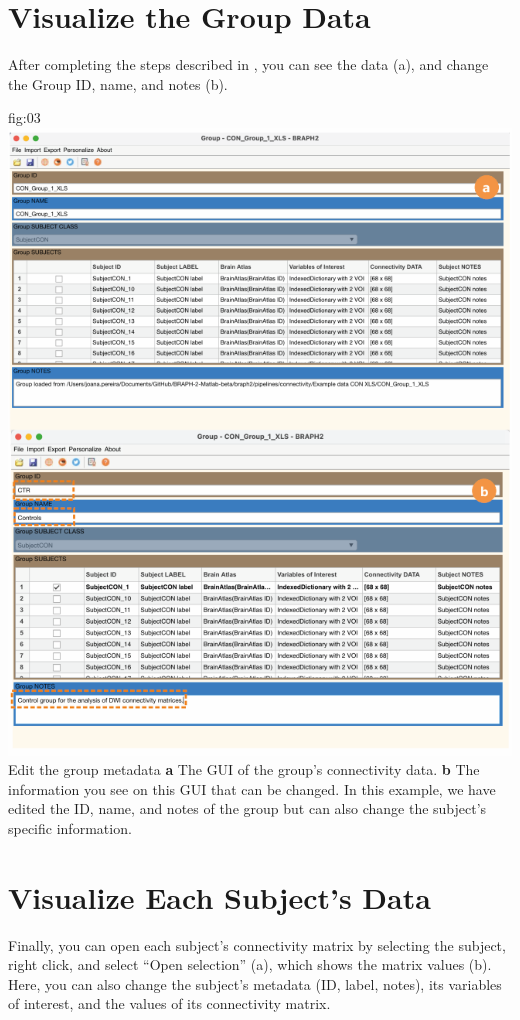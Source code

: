 \documentclass[justified]{tufte-handout}
\begin{document}
\section{Visualize the Group Data}

After completing the steps described in , you can see the data (a), and change the Group ID, name, and notes (b). 

	{fig:03}
	{
	\includegraphics{fig03}
	}
	{Edit the group metadata}
	{ 
	{\bf a} The GUI of the group's connectivity data. 
	{\bf b} The information you see on this GUI that can be changed. In this example, we have edited the ID, name, and notes of the group but can also change the subject's specific information.
	}

\section{Visualize Each Subject's Data}

Finally, you can open each subject's connectivity matrix by selecting the subject, right click, and select ``Open selection'' (a), which shows the matrix values (b). Here, you can also change the subject's metadata (ID, label, notes), its variables of interest, and the values of its connectivity matrix.
\end{document}
